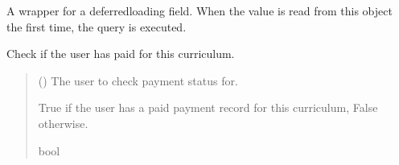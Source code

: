 \documentclass[letterpaper,10pt,english]{sphinxmanual}
\begin{document}
\begin{fulllineitems}
\begin{fulllineitems}
\label{\detokenize{courses:courses.models.Curriculum.get_previous_by_updated_at}}
\pysigstartsignatures
\pysiglinewithargsret
{}
{\sphinxparamcomma {}\sphinxparamcomma {}\sphinxparamcomma {}}
{}
\pysigstopsignatures
\end{fulllineitems}


\begin{fulllineitems}
\label{\detokenize{courses:courses.models.Curriculum.id}}
\pysigstartsignatures
\pysigline
{}
\pysigstopsignatures
\sphinxAtStartPar
A wrapper for a deferred\sphinxhyphen{}loading field. When the value is read from this
object the first time, the query is executed.

\end{fulllineitems}


\begin{fulllineitems}
\label{\detokenize{courses:id0}}
\pysigstartsignatures
\pysiglinewithargsret
{}
{}
{}
\pysigstopsignatures
\sphinxAtStartPar
Check if the user has paid for this curriculum.
\begin{quote}\begin{description}
\sphinxAtStartPar
{} () \textendash{} The user to check payment status for.

\sphinxAtStartPar
True if the user has a paid payment record for this curriculum, False otherwise.

\sphinxAtStartPar
bool

\end{description}\end{quote}

\end{fulllineitems}


\end{fulllineitems}
\end{document}
